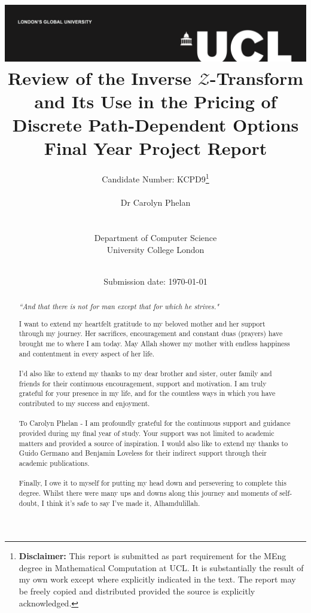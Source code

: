 \documentclass[a4paper]{report}
\title{{\vspace{-14em} \includegraphics[scale=0.4]{Logos/ucl_logo.png}}\\
{{\vspace{2em} \Huge Review of the Inverse $\mathcal{Z}$-Transform and Its Use in the Pricing of Discrete Path-Dependent Options}}\\
{\large Final Year Project Report}\\
}
\date{Submission date: \today}
\author{Candidate Number: KCPD9\thanks{
{\bf Disclaimer:}
This report is submitted as part requirement for the MEng degree in Mathematical Computation at UCL. It is substantially the result of my own work except where explicitly indicated in the text. The report may be freely copied and distributed provided the source is explicitly acknowledged.}
\\ \\ Dr Carolyn Phelan
\\ \\ \\ Department of Computer Science
\\ University College London
\\ \\
}
\begin{document}
\onehalfspacing
\maketitle

\renewcommand{\abstractname}{Acknowledgements}
\begin{abstract}
\begin{center}
\textit{``And that there is not for man except that for which he strives."}
\\ 
\end{center}

I want to extend my heartfelt gratitude to my beloved mother and her support through my journey. Her sacrifices, encouragement and constant duas (prayers) have brought me to where I am today. May Allah shower my mother with endless happiness and contentment in every aspect of her life.
\\\\
I'd also like to extend my thanks to my dear brother and sister, outer family and friends for their continuous encouragement, support and motivation. I am truly grateful for your presence in my life, and for the countless ways in which you have contributed to my success and enjoyment.
\\\\
To Carolyn Phelan - I am profoundly grateful for the continuous support and guidance provided during my final year of study. Your support was not limited to academic matters and provided a source of inspiration. I would also like to extend my thanks to Guido Germano and Benjamin Loveless for their indirect support through their academic publications.
\\\\
Finally, I owe it to myself for putting my head down and persevering to complete this degree. Whilst there were many ups and downs along this journey and moments of self-doubt, I think it's safe to say I've made it, Alhamdulillah.

\end{abstract}
\end{document}
